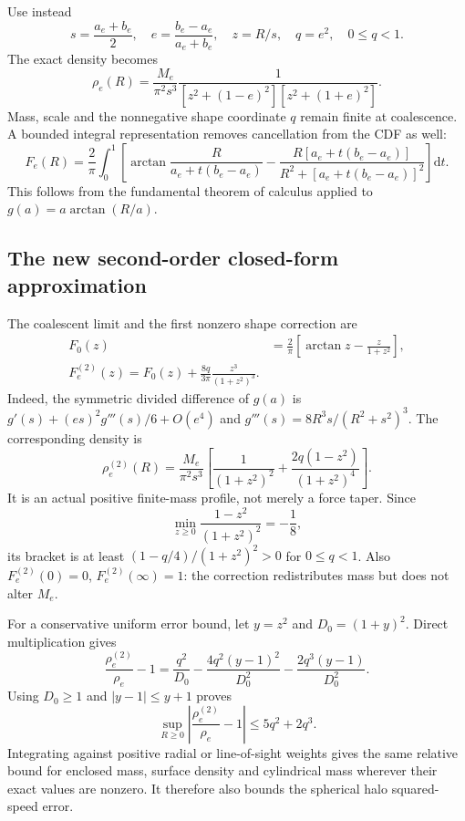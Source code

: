 \documentclass[11pt]{article}
\newcommand{\dd}{\mathrm d}
\begin{document}
Use instead
\begin{equation}
 s=\frac{a_e+b_e}{2},\quad e=\frac{b_e-a_e}{a_e+b_e},\quad
 z=R/s,\quad q=e^2,\quad 0\le q<1.
\end{equation}
The exact density becomes
\begin{equation}
 \rho_e(R)=\frac{M_e}{\pi^2s^3}
  \frac{1}{[z^2+(1-e)^2][z^2+(1+e)^2]}.\label{ext:exactstable}
\end{equation}
Mass, scale and the nonnegative shape coordinate $q$ remain finite at coalescence. A bounded integral representation removes cancellation from the CDF as well:
\begin{equation}
 F_e(R)=\frac{2}{\pi}\int_0^1
 \left[\arctan\frac{R}{a_e+t(b_e-a_e)}-
 \frac{R[a_e+t(b_e-a_e)]}{R^2+[a_e+t(b_e-a_e)]^2}\right]\dd t.
\end{equation}
This follows from the fundamental theorem of calculus applied to $g(a)=a\arctan(R/a)$.

\subsection{The new second-order closed-form approximation}
The coalescent limit and the first nonzero shape correction are
\begin{align}
 F_0(z)&=\frac{2}{\pi}\left[\arctan z-\frac{z}{1+z^2}\right],\\
 \boxed{F_e^{(2)}(z)=F_0(z)+\frac{8q}{3\pi}\frac{z^3}{(1+z^2)^3}.}
 \label{ext:newcdf}
\end{align}
Indeed, the symmetric divided difference of $g(a)$ is
$g'(s)+(es)^2g'''(s)/6+O(e^4)$ and $g'''(s)=8R^3s/(R^2+s^2)^3$.
The corresponding density is
\begin{equation}
 \boxed{\rho_e^{(2)}(R)=\frac{M_e}{\pi^2s^3}
 \left[\frac{1}{(1+z^2)^2}+
              \frac{2q(1-z^2)}{(1+z^2)^4}\right].}\label{ext:newrho}
\end{equation}
It is an actual positive finite-mass profile, not merely a force taper. Since
\begin{equation}
 \min_{z\ge0}\frac{1-z^2}{(1+z^2)^2}=-\frac18,
\end{equation}
its bracket is at least $(1-q/4)/(1+z^2)^2>0$ for $0\le q<1$. Also $F_e^{(2)}(0)=0$, $F_e^{(2)}(\infty)=1$: the correction redistributes mass but does not alter $M_e$.

For a conservative uniform error bound, let $y=z^2$ and $D_0=(1+y)^2$. Direct multiplication gives
\begin{equation}
 \frac{\rho_e^{(2)}}{\rho_e}-1
 =\frac{q^2}{D_0}-\frac{4q^2(y-1)^2}{D_0^2}
                         -\frac{2q^3(y-1)}{D_0^2}.
\end{equation}
Using $D_0\ge1$ and $|y-1|\le y+1$ proves
\begin{equation}
 \boxed{\sup_{R\ge0}\left|\frac{\rho_e^{(2)}}{\rho_e}-1\right|
       \le5q^2+2q^3.}\label{ext:uniformbound}
\end{equation}
Integrating against positive radial or line-of-sight weights gives the same relative bound for enclosed mass, surface density and cylindrical mass wherever their exact values are nonzero. It therefore also bounds the spherical halo squared-speed error.
\end{document}
